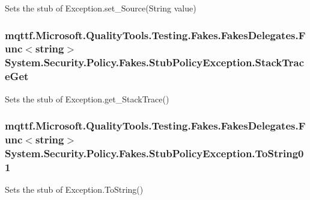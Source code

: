 Sets the stub of Exception.\-set\-\_\-\-Source(\-String value)

\hypertarget{class_system_1_1_security_1_1_policy_1_1_fakes_1_1_stub_policy_exception_aed8fbe27b7eec474b5abb4bc990f5604}{
\subsubsection[{Stack\-Trace\-Get}]{\setlength{\rightskip}{0pt plus 5cm}mqttf.\-Microsoft.\-Quality\-Tools.\-Testing.\-Fakes.\-Fakes\-Delegates.\-Func$<$string$>$ System.\-Security.\-Policy.\-Fakes.\-Stub\-Policy\-Exception.\-Stack\-Trace\-Get}}\label{class_system_1_1_security_1_1_policy_1_1_fakes_1_1_stub_policy_exception_aed8fbe27b7eec474b5abb4bc990f5604}


Sets the stub of Exception.\-get\-\_\-\-Stack\-Trace()

\hypertarget{class_system_1_1_security_1_1_policy_1_1_fakes_1_1_stub_policy_exception_a6c7f82057c8fac603b5f6b0fba2c994a}{
\subsubsection[{To\-String01}]{\setlength{\rightskip}{0pt plus 5cm}mqttf.\-Microsoft.\-Quality\-Tools.\-Testing.\-Fakes.\-Fakes\-Delegates.\-Func$<$string$>$ System.\-Security.\-Policy.\-Fakes.\-Stub\-Policy\-Exception.\-To\-String01}}\label{class_system_1_1_security_1_1_policy_1_1_fakes_1_1_stub_policy_exception_a6c7f82057c8fac603b5f6b0fba2c994a}


Sets the stub of Exception.\-To\-String()



